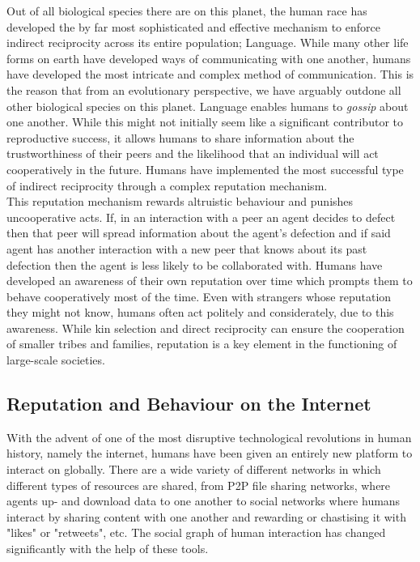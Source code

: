 \documentclass[11pt,a4paper]{report}
\theoremstyle{definition}
\theoremstyle{theorem}
\theoremstyle{proposition}
\theoremstyle{corollary}
\theoremstyle{lemma}
\theoremstyle{example}
\theoremstyle{remark}
\begin{document}
\noindent{}Out of all biological species there are on this planet, the human race has developed the by far most sophisticated and effective mechanism to enforce indirect reciprocity across its entire population; Language. While many other life forms on earth have developed ways of communicating with one another, humans have developed the most intricate and complex method of communication. This is the reason that from an evolutionary perspective, we have arguably outdone all other biological species on this planet. Language enables humans to {\it gossip} about one another. While this might not initially seem like a significant contributor to reproductive success, it allows humans to share information about the trustworthiness of their peers and the likelihood that an individual will act cooperatively in the future. Humans have implemented the most successful type of indirect reciprocity through a complex reputation mechanism. \vspace{1em}\\

\noindent{}This reputation mechanism rewards altruistic behaviour and punishes uncooperative acts. If, in an interaction with a peer an agent decides to defect then that peer will spread information about the agent's defection and if said agent has another interaction with a new peer that knows about its past defection then the agent is less likely to be collaborated with. Humans have developed an awareness of their own reputation over time which prompts them to behave cooperatively most of the time. Even with strangers whose reputation they might not know, humans often act politely and considerately, due to this awareness. While kin selection and direct reciprocity can ensure the cooperation of smaller tribes and families, reputation is a key element in the functioning of large-scale societies. \vspace{1em}\\

\subsection{Reputation and Behaviour on the Internet}
\label{subsec:Reputation and Behaviour on the Internet}
\noindent{}With the advent of one of the most disruptive technological revolutions in human history, namely the internet, humans have been given an entirely new platform to interact on globally. There are a wide variety of different networks in which different types of resources are shared, from P2P file sharing networks, where agents up- and download data to one another to social networks where humans interact by sharing content with one another and rewarding or chastising it with "likes" or "retweets", etc. The social graph of human interaction has changed significantly with the help of these tools.\vspace{1em}\\
\end{document}
